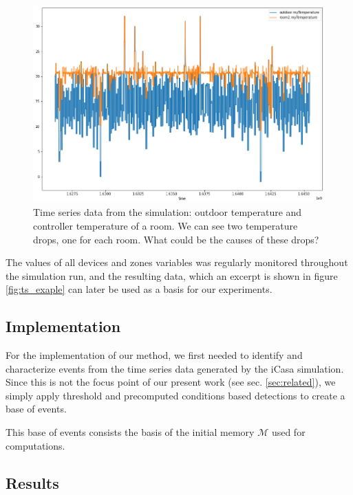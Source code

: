 \documentclass[conference]{IEEEtran}
\begin{document}
\begin{figure}[ht]
  \includegraphics[width=\linewidth]{figures/ts_example}
  \caption{Time series data from the simulation: outdoor temperature and controller temperature of a room. We can see two temperature drops, one for each room. What could be the causes of these drops?}
  \label{fig:ts_example}
\end{figure}

The values of all devices and zones variables was regularly monitored throughout the simulation run, and the resulting data, which an excerpt is shown in figure \ref{fig:ts_exaple} can later be used as a basis for our experiments.
\subsection{Implementation}

For the implementation of our method, we first needed to identify and characterize events from the time series data generated by the iCasa simulation. Since this is not the focus point of our present work (see sec. \ref{sec:related}), we simply apply threshold and precomputed conditions based detections to create a base of events.


This base of events consists the basis of the initial memory $\mathcal{M}$ used for computations.

\subsection{Results}
\end{document}
